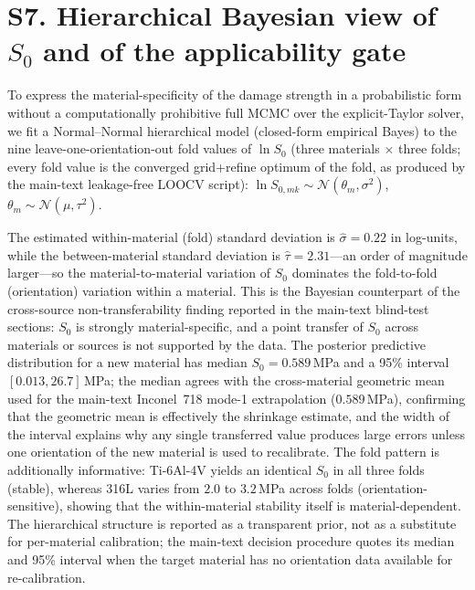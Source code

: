 \documentclass[11pt,a4paper,twocolumn]{article}
\begin{document}
\section*{S7. Hierarchical Bayesian view of $S_0$ and of the applicability gate}

To express the material-specificity of the damage strength in a probabilistic form without a computationally prohibitive full MCMC over the explicit-Taylor solver, we fit a Normal--Normal hierarchical model (closed-form empirical Bayes) to the nine leave-one-orientation-out fold values of $\ln S_0$ (three materials $\times$ three folds; every fold value is the converged grid+refine optimum of the fold, as produced by the main-text leakage-free LOOCV script): $\ln S_{0,mk} \sim \mathcal{N}(\theta_m, \sigma^2)$, $\theta_m \sim \mathcal{N}(\mu, \tau^2)$.

The estimated within-material (fold) standard deviation is $\hat\sigma = 0.22$ in log-units, while the between-material standard deviation is $\hat\tau = 2.31$---an order of magnitude larger---so the material-to-material variation of $S_0$ dominates the fold-to-fold (orientation) variation within a material. This is the Bayesian counterpart of the cross-source non-transferability finding reported in the main-text blind-test sections: $S_0$ is strongly material-specific, and a point transfer of $S_0$ across materials or sources is not supported by the data. The posterior predictive distribution for a new material has median $S_0 = 0.589$\,MPa and a 95\% interval $[0.013, 26.7]$\,MPa; the median agrees with the cross-material geometric mean used for the main-text Inconel~718 mode-1 extrapolation ($0.589$\,MPa), confirming that the geometric mean is effectively the shrinkage estimate, and the width of the interval explains why any single transferred value produces large errors unless one orientation of the new material is used to recalibrate. The fold pattern is additionally informative: Ti-6Al-4V yields an identical $S_0$ in all three folds (stable), whereas 316L varies from $2.0$ to $3.2$\,MPa across folds (orientation-sensitive), showing that the within-material stability itself is material-dependent. The hierarchical structure is reported as a transparent prior, not as a substitute for per-material calibration; the main-text decision procedure quotes its median and 95\% interval when the target material has no orientation data available for re-calibration.
\end{document}
